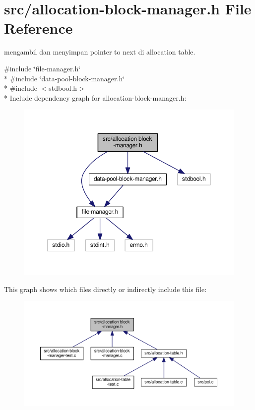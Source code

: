 \hypertarget{allocation-block-manager_8h}{\section{src/allocation-\/block-\/manager.h File Reference}
\label{allocation-block-manager_8h}
}


mengambil dan menyimpan pointer to next di allocation table.  


{\ttfamily \#include \char`\"{}file-\/manager.\-h\char`\"{}}\\*
{\ttfamily \#include \char`\"{}data-\/pool-\/block-\/manager.\-h\char`\"{}}\\*
{\ttfamily \#include $<$stdbool.\-h$>$}\\*
Include dependency graph for allocation-\/block-\/manager.h\-:\nopagebreak
\begin{figure}[H]
\begin{center}
\leavevmode
\includegraphics[width=350pt]{allocation-block-manager_8h__incl}
\end{center}
\end{figure}
This graph shows which files directly or indirectly include this file\-:\nopagebreak
\begin{figure}[H]
\begin{center}
\leavevmode
\includegraphics[width=350pt]{allocation-block-manager_8h__dep__incl}
\end{center}
\end{figure}
